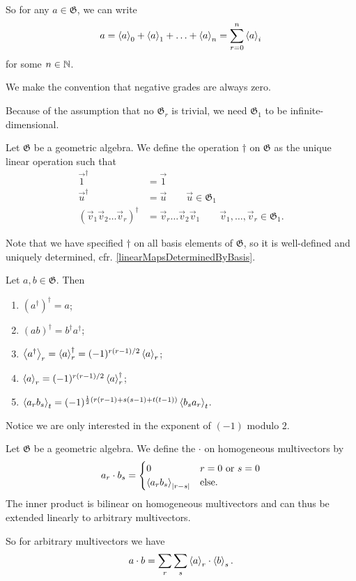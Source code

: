 So for any $a\in \mathfrak{G}$, we can write
\[ a = \left\langle a \right\rangle_0 + \left\langle a \right\rangle_1 + \ldots + \left\langle a \right\rangle_n  = \sum_{r=0}^n \left\langle a \right\rangle_i  \] for some $n\in\mathbb{N}$.

We make the convention that negative grades are always zero.

Because of the assumption that no $\mathfrak{G}_r$ is trivial, we need $\mathfrak{G}_1$ to be infinite-dimensional.


\begin{definition}
Let $\mathfrak{G}$ be a geometric algebra. We define the  operation $\dagger$ on $\mathfrak{G}$ as the unique linear operation such that
\begin{align*}
\vec{1}^\dagger &= \vec{1} \\
\vec{u}^\dagger &= \vec{u} \qquad \vec{u}\in\mathfrak{G}_1 \\
(\vec{v}_1 \vec{v}_2 \ldots \vec{v}_r)^\dagger &= \vec{v}_r \ldots \vec{v}_2 \vec{v}_1 \qquad \vec{v}_1, \ldots, \vec{v}_r \in \mathfrak{G}_1.
\end{align*}
\end{definition}
Note that we have specified $\dagger$ on all basis elements of $\mathfrak{G}$, so it is well-defined and uniquely determined, cfr. \ref{linearMapsDeterminedByBasis}.

\begin{lemma}
Let $a,b \in \mathfrak{G}$. Then
\begin{enumerate}
\item $(a^\dagger)^\dagger = a$;
\item $(ab)^\dagger = b^\dagger a^\dagger$;
\item $\left\langle a^\dagger \right\rangle_r = \left\langle a \right\rangle_r^\dagger = (-1)^{r(r-1)/2}\left\langle a \right\rangle_r$;
\item $\left\langle a \right\rangle_r = (-1)^{r(r-1)/2}\left\langle a \right\rangle_r^\dagger$;
\item $\left\langle a_rb_s \right\rangle_t = (-1)^{\frac{1}{2}(r(r-1) + s(s-1) + t(t-1))}\left\langle b_sa_r \right\rangle_t$.
\end{enumerate}
\end{lemma}
Notice we are only interested in the exponent of $(-1)$ modulo $2$.

\begin{definition}
Let $\mathfrak{G}$ be a geometric algebra. We define the  $\cdot$ on homogeneous multivectors by
\[ a_r\cdot b_s = \begin{cases}
0 & \text{$r=0$ or $s=0$} \\
\left\langle a_rb_s \right\rangle_{|r-s|} & \text{else}.
\end{cases}  \]
The inner product is bilinear on homogeneous multivectors and can thus be extended linearly to arbitrary multivectors.
\end{definition}
So for arbitrary multivectors we have
\[ a\cdot b = \sum_r\sum_s \left\langle a \right\rangle_r\cdot \left\langle b \right\rangle_s. \]

